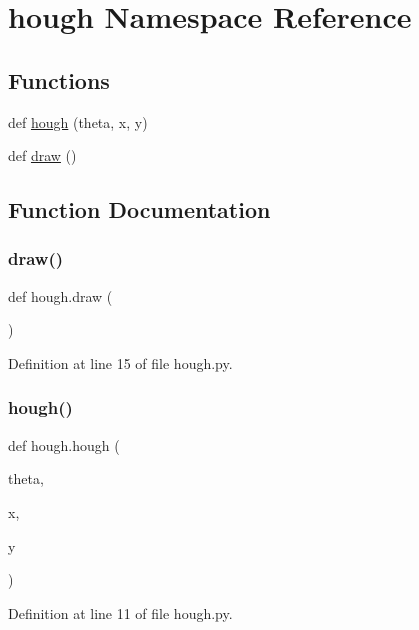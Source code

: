 \hypertarget{namespacehough}{}\section{hough Namespace Reference}
\label{namespacehough}
\subsection*{Functions}
\begin{DoxyCompactItemize}
\item 
def \hyperlink{namespacehough_a28f35c545020352236e7510438d0b128}{hough} (theta, x, y)
\item 
def \hyperlink{namespacehough_ae653b6bbd7c3c3a0e7a1b4c64e52f351}{draw} ()
\end{DoxyCompactItemize}


\subsection{Function Documentation}
\mbox{\label{namespacehough_ae653b6bbd7c3c3a0e7a1b4c64e52f351}} 
\subsubsection{\texorpdfstring{draw()}{draw()}}
{\footnotesize\ttfamily def hough.\+draw (\begin{DoxyParamCaption}{ }\end{DoxyParamCaption})}



Definition at line 15 of file hough.\+py.

\mbox{\label{namespacehough_a28f35c545020352236e7510438d0b128}} 
\subsubsection{\texorpdfstring{hough()}{hough()}}
{\footnotesize\ttfamily def hough.\+hough (\begin{DoxyParamCaption}\item[{}]{theta,  }\item[{}]{x,  }\item[{}]{y }\end{DoxyParamCaption})}



Definition at line 11 of file hough.\+py.

